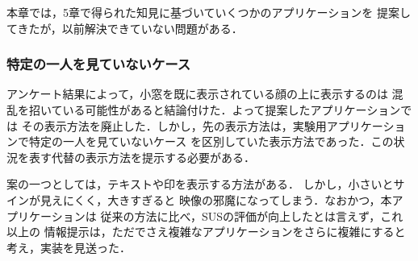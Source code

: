本章では，5章で得られた知見に基づいていくつかのアプリケーションを
提案してきたが，以前解決できていない問題がある．

\subsubsection*{特定の一人を見ていないケース}
アンケート結果によって，小窓を既に表示されている顔の上に表示するのは
混乱を招いている可能性があると結論付けた．よって提案したアプリケーションでは
その表示方法を廃止した．しかし，先の表示方法は，実験用アプリケーションで特定の一人を見ていないケース
を区別していた表示方法であった．この状況を表す代替の表示方法を提示する必要がある．

案の一つとしては，テキストや印を表示する方法がある．
しかし，小さいとサインが見えにくく，大きすぎると
映像の邪魔になってしまう．なおかつ，本アプリケーションは
従来の方法に比べ，SUSの評価が向上したとは言えず，これ以上の
情報提示は，ただでさえ複雑なアプリケーションをさらに複雑にすると
考え，実装を見送った．

